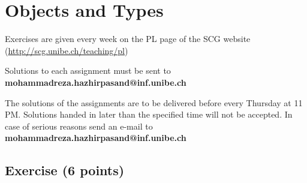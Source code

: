 \documentclass [11pt, a4wide, twoside]{article}
\begin{document}
\section*{\space{} Objects and Types}


\begin{myitemize}
\item Exercises are given every week on the PL page of the SCG website \\ (\url{http://scg.unibe.ch/teaching/pl})
\item Solutions to each assignment must be sent to \textbf{mohammadreza.hazhirpasand@inf.unibe.ch}
\item The solutions of the assignments are to be delivered before every Thursday at 11 PM. Solutions handed in later than the specified time will not be accepted. In case of serious reasons send an e-mail to  \textbf{mohammadreza.hazhirpasand@inf.unibe.ch}
\end{myitemize}


\subsection*{Exercise (6 points)}
\end{document}
